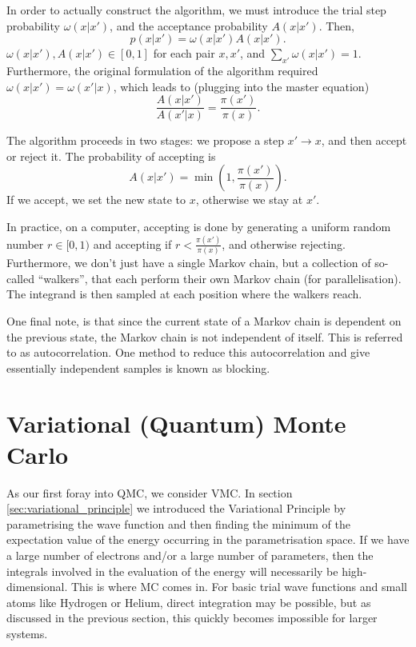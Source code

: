 In order to actually construct the algorithm, we must introduce the trial step probability $\omega(x|x')$, and the acceptance probability $A(x|x')$. Then,
\begin{equation}
    p(x|x') = \omega(x|x')A(x|x').
\end{equation}
$\omega(x|x'),A(x|x')\in [0,1]$ for each pair $x,x'$, and $\sum_{x'}\omega(x|x') = 1$. Furthermore, the original formulation of the algorithm required $\omega(x|x') = \omega(x'|x)$, which leads to (plugging into the master equation)
\begin{equation}
    \frac{A(x|x')}{A(x'|x)} = \frac{\pi(x')}{\pi(x)}.
\end{equation}

The algorithm proceeds in two stages: we propose a step $x'\to x$, and then accept or reject it. The probability of accepting is
\begin{equation}
    A(x|x') = \min\left(1,\frac{\pi(x')}{\pi(x)}\right).
\end{equation}
If we accept, we set the new state to $x$, otherwise we stay at $x'$.

In practice, on a computer, accepting is done by generating a uniform random number $r\in [0,1)$ and accepting if $r<\frac{\pi(x')}{\pi(x)}$, and otherwise rejecting. Furthermore, we don't just have a single Markov chain, but a collection of so-called ``walkers'', that each perform their own Markov chain (for parallelisation). The integrand is then sampled at each position where the walkers reach.

One final note, is that since the current state of a Markov chain is dependent on the previous state, the Markov chain is not independent of itself. This is referred to as autocorrelation. One method to reduce this autocorrelation and give essentially independent samples is known as blocking.\supercite{flyvbjergError1989}

\section{Variational (Quantum) Monte Carlo}
\label{sec:vmc}

As our first foray into \gls{QMC}, we consider \gls{VMC}. In section \ref{sec:variational_principle} we introduced the Variational Principle by parametrising the wave function and then finding the minimum of the expectation value of the energy occurring in the parametrisation space. If we have a large number of electrons and/or a large number of parameters, then the integrals involved in the evaluation of the energy will necessarily be high-dimensional. This is where \gls{MC} comes in. For basic trial wave functions and small atoms like Hydrogen or Helium, direct integration may be possible, but as discussed in the previous section, this quickly becomes impossible for larger systems.

